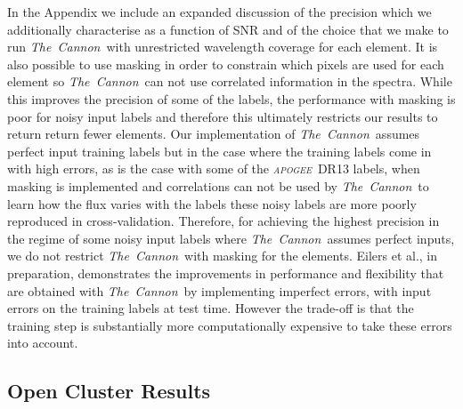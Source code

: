 \documentclass[14pt, preprint2]{aastex6}
\newcommand{\project}[1]{\textsl{#1}}
\newcommand{\tc}{\project{The~Cannon}}
\newcommand{\apogee}{\project{\textsc{apogee}}}
\begin{document}
In the Appendix we include an expanded discussion of the precision which we additionally characterise as a function of SNR and of the choice that we make to run \tc\ with unrestricted wavelength coverage for each element. It is also possible to use masking in order to constrain which pixels are used for each element so \tc\ can not use correlated information in the spectra. While this improves the precision of some of the labels, the performance with masking is poor for noisy input labels and therefore this ultimately restricts our results to return return fewer elements. Our implementation of \tc\ assumes perfect input training labels but in the case where the training labels come in with high errors, as is the case with some of the \apogee\ DR13 labels, when masking is implemented and correlations can not be used by \tc\ to learn how the flux varies with the labels these noisy labels are more poorly reproduced in cross-validation. Therefore, for achieving the highest precision in the regime of some noisy input labels where \tc\ assumes perfect inputs, we do not restrict \tc\ with masking for the elements. Eilers et al., in preparation, demonstrates the improvements in performance and flexibility that are obtained  with \tc\ by implementing imperfect errors, with input errors on the training labels at test time. However the trade-off is that the training step is substantially more computationally expensive to take these errors into account. 

\subsection{Open Cluster Results} 
\end{document}

